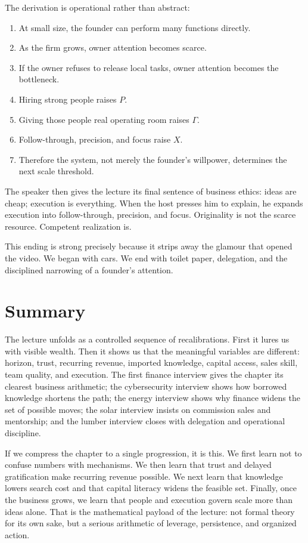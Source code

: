 The derivation is operational rather than abstract:
\begin{enumerate}
\item At small size, the founder can perform many functions directly.
\item As the firm grows, owner attention becomes scarce.
\item If the owner refuses to release local tasks, owner attention becomes the bottleneck.
\item Hiring strong people raises \(P\).
\item Giving those people real operating room raises \(\Gamma\).
\item Follow-through, precision, and focus raise \(X\).
\item Therefore the system, not merely the founder's willpower, determines the next scale threshold.
\end{enumerate}

The speaker then gives the lecture its final sentence of business ethics: ideas are cheap; execution is everything. When the host presses him to explain, he expands execution into follow-through, precision, and focus. Originality is not the scarce resource. Competent realization is.

This ending is strong precisely because it strips away the glamour that opened the video. We began with cars. We end with toilet paper, delegation, and the disciplined narrowing of a founder's attention.

\section{Summary}

The lecture unfolds as a controlled sequence of recalibrations. First it lures us with visible wealth. Then it shows us that the meaningful variables are different: horizon, trust, recurring revenue, imported knowledge, capital access, sales skill, team quality, and execution. The first finance interview gives the chapter its clearest business arithmetic; the cybersecurity interview shows how borrowed knowledge shortens the path; the energy interview shows why finance widens the set of possible moves; the solar interview insists on commission sales and mentorship; and the lumber interview closes with delegation and operational discipline.

If we compress the chapter to a single progression, it is this. We first learn not to confuse numbers with mechanisms. We then learn that trust and delayed gratification make recurring revenue possible. We next learn that knowledge lowers search cost and that capital literacy widens the feasible set. Finally, once the business grows, we learn that people and execution govern scale more than ideas alone. That is the mathematical payload of the lecture: not formal theory for its own sake, but a serious arithmetic of leverage, persistence, and organized action.